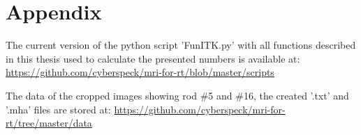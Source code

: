 \chapter*{Appendix}

The current version of the python script 'FunITK.py' with all functions described in this thesis used to calculate the presented numbers is available at: \url{https://github.com/cyberspeck/mri-for-rt/blob/master/scripts}

The data of the cropped images showing rod \#5 and \#16, the created '.txt' and '.mha' files are stored at: \url{https://github.com/cyberspeck/mri-for-rt/tree/master/data}

